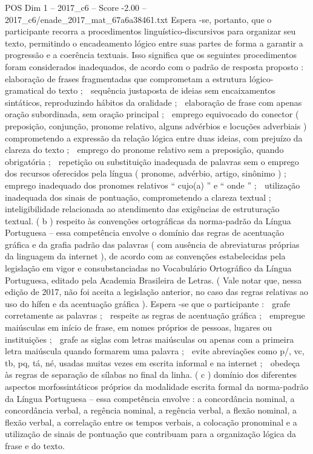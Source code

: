 \begin{textsample}{POS Dim 1 – 2017\_c6 – Score -2.00 – 2017\_c6/enade\_2017\_mat\_67a6a38461.txt}
Espera -se, portanto, que o participante recorra a procedimentos linguístico-discursivos para organizar seu texto, permitindo o encadeamento lógico entre suas partes de forma a garantir a progressão e a coerência textuais.
Isso significa que os seguintes procedimentos foram considerados inadequados, de acordo com o padrão de resposta proposto :  elaboração de frases fragmentadas que comprometam a estrutura lógico-gramatical do texto ;  sequência justaposta de ideias sem encaixamentos sintáticos, reproduzindo hábitos da oralidade ;  elaboração de frase com apenas oração subordinada, sem oração principal ;  emprego equivocado do conector ( preposição, conjunção, pronome relativo, alguns advérbios e locuções adverbiais ) comprometendo a expressão da relação lógica entre duas ideias, com prejuízo da clareza do texto ;  emprego do pronome relativo sem a preposição, quando obrigatória ;  repetição ou substituição inadequada de palavras sem o emprego dos recursos oferecidos pela língua ( pronome, advérbio, artigo, sinônimo ) ;  emprego inadequado dos pronomes relativos “ cujo(a) ” e “ onde ” ;  utilização inadequada dos sinais de pontuação, comprometendo a clareza textual ;  inteligibilidade relacionada ao atendimento das exigências de estruturação textual. ( b ) respeito às convenções ortográficas da norma-padrão da Língua Portuguesa – essa competência envolve o domínio das regras de acentuação gráfica e da grafia padrão das palavras ( com ausência de abreviaturas próprias da linguagem da internet ), de acordo com as convenções estabelecidas pela legislação em vigor e consubstanciadas no Vocabulário Ortográfico da Língua Portuguesa, editado pela Academia Brasileira de Letras. ( Vale notar que, nessa edição de 2017, não foi aceita a legislação anterior, no caso das regras relativas ao uso do hífen e da acentuação gráfica ).
Espera -se que o participante :  grafe corretamente as palavras ;  respeite as regras de acentuação gráfica ;  empregue maiúsculas em início de frase, em nomes próprios de pessoas, lugares ou instituições ;  grafe as siglas com letras maiúsculas ou apenas com a primeira letra maiúscula quando formarem uma palavra ;  evite abreviações como p/, vc, tb, pq, tá, né, usadas muitas vezes em escrita informal e na internet ;  obedeça às regras de separação de sílabas no final da linha. ( c ) domínio dos diferentes aspectos morfossintáticos próprios da modalidade escrita formal da norma-padrão da Língua Portuguesa – essa competência envolve : a concordância nominal, a concordância verbal, a regência nominal, a regência verbal, a flexão nominal, a flexão verbal, a correlação entre os tempos verbais, a colocação pronominal e a utilização de sinais de pontuação que contribuam para a organização lógica da frase e do texto.

\end{textsample}

